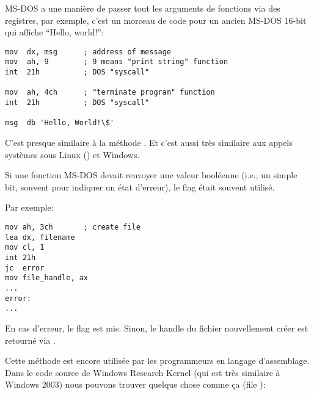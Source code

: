 MS-DOS a une manière de passer tout les arguments de fonctions via des registres,
par exemple, c'est un morceau de code pour un ancien MS-DOS 16-bit qui affiche
``Hello, world!'':

\begin{lstlisting}[style=customasmx86]
mov  dx, msg      ; address of message
mov  ah, 9        ; 9 means "print string" function
int  21h          ; DOS "syscall"

mov  ah, 4ch      ; "terminate program" function
int  21h          ; DOS "syscall"

msg  db 'Hello, World!\$'
\end{lstlisting}

C'est presque similaire à la méthode .
Et c'est aussi très similaire aux appels systèmes sous Linux () et Windows.

Si une fonction MS-DOS devait renvoyer une valeur booléenne (i.e., un simple bit,
souvent pour indiquer un état d'erreur), le flag  était souvent utilisé.

Par exemple:

\begin{lstlisting}[style=customasmx86]
mov ah, 3ch       ; create file
lea dx, filename
mov cl, 1
int 21h
jc  error
mov file_handle, ax
...
error:
...
\end{lstlisting}

En cas d'erreur, le flag  est mis. Sinon, le handle du fichier nouvellement
créer est retourné via .

Cette méthode est encore utilisée par les programmeurs en langage d'assemblage.
Dans le code source de Windows Research Kernel (qui est très similaire à Windows
2003) nous pouvons trouver quelque chose comme ça (file ):

